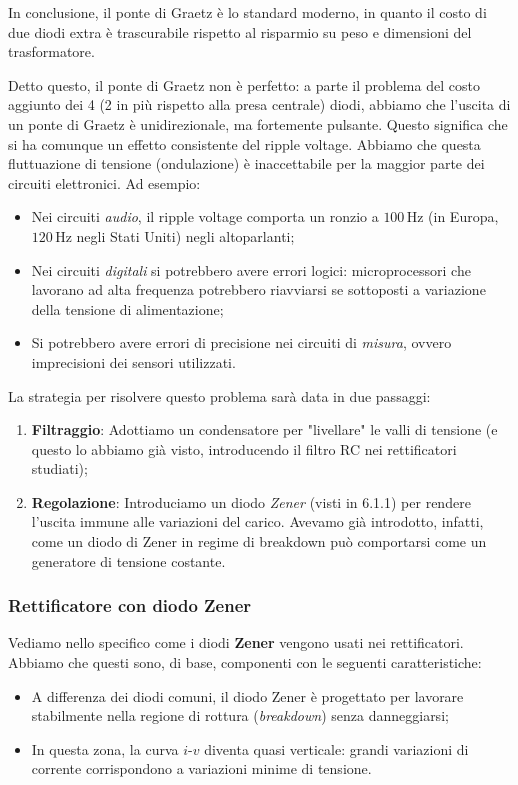 \documentclass[a4paper,11pt]{article}
\begin{document}
In conclusione, il ponte di Graetz è lo standard moderno, in quanto il costo di due diodi extra è trascurabile rispetto al risparmio su peso e dimensioni del trasformatore.

Detto questo, il ponte di Graetz non è perfetto: a parte il problema del costo aggiunto dei 4 (2 in più rispetto alla presa centrale) diodi, abbiamo che l’uscita di un ponte di Graetz è unidirezionale, ma fortemente pulsante. Questo significa che si ha comunque un effetto consistente del ripple voltage. Abbiamo che questa fluttuazione di tensione (ondulazione) è inaccettabile per la maggior parte dei circuiti elettronici. Ad esempio:

\begin{itemize}
	\item Nei circuiti \textit{audio}, il ripple voltage comporta un ronzio a $100 \, \mathrm{Hz}$ (in Europa, $120 \, \mathrm{Hz}$ negli Stati Uniti) negli altoparlanti;
	\item Nei circuiti \textit{digitali} si potrebbero avere errori logici: microprocessori che lavorano ad alta frequenza potrebbero riavviarsi se sottoposti a variazione della tensione di alimentazione;
	\item Si potrebbero avere errori di precisione nei circuiti di \textit{misura}, ovvero imprecisioni dei sensori utilizzati.
\end{itemize}

La strategia per risolvere questo problema sarà data in due passaggi:
\begin{enumerate}
	\item \textbf{Filtraggio}: Adottiamo un condensatore per "livellare" le valli di tensione (e questo lo abbiamo già visto, introducendo il filtro RC nei rettificatori studiati);
	\item \textbf{Regolazione}: Introduciamo un diodo \textit{Zener} (visti in 6.1.1) per rendere l’uscita immune alle variazioni del carico. Avevamo già introdotto, infatti, come un diodo di Zener in regime di breakdown può comportarsi come un generatore di tensione costante.
\end{enumerate}

\subsubsection{Rettificatore con diodo Zener}
Vediamo nello specifico come i diodi \textbf{Zener} vengono usati nei rettificatori. Abbiamo che questi sono, di base, componenti con le seguenti caratteristiche:
\begin{itemize}
    \item A differenza dei diodi comuni, il diodo Zener è progettato per lavorare stabilmente nella regione di rottura (\textit{breakdown}) senza danneggiarsi;
	\item In questa zona, la curva $i\text{-}v$ diventa quasi verticale: grandi variazioni di corrente corrispondono a variazioni minime di tensione.
\end{itemize}
\end{document}
